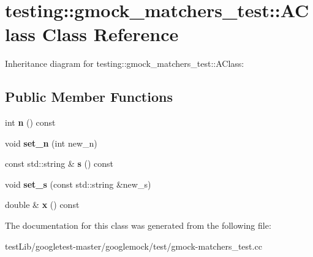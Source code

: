 \hypertarget{classtesting_1_1gmock__matchers__test_1_1AClass}{}\section{testing\+:\+:gmock\+\_\+matchers\+\_\+test\+:\+:A\+Class Class Reference}
\label{classtesting_1_1gmock__matchers__test_1_1AClass}


Inheritance diagram for testing\+:\+:gmock\+\_\+matchers\+\_\+test\+:\+:A\+Class\+:
\subsection*{Public Member Functions}
\begin{DoxyCompactItemize}
\item 
\mbox{\label{classtesting_1_1gmock__matchers__test_1_1AClass_add84ab9ef4a6bbe78719a9528bf6fb90}} 
int {\bfseries n} () const
\item 
\mbox{\label{classtesting_1_1gmock__matchers__test_1_1AClass_a3181466cec6faa5ab3c6bc5c4dbf67b2}} 
void {\bfseries set\+\_\+n} (int new\+\_\+n)
\item 
\mbox{\label{classtesting_1_1gmock__matchers__test_1_1AClass_a1645862d2061ccf04b67761314c7bb97}} 
const std\+::string \& {\bfseries s} () const
\item 
\mbox{\label{classtesting_1_1gmock__matchers__test_1_1AClass_a9e2ea4f630928618137cfaadb6298fcf}} 
void {\bfseries set\+\_\+s} (const std\+::string \&new\+\_\+s)
\item 
\mbox{\label{classtesting_1_1gmock__matchers__test_1_1AClass_ade61d438cb535d71d0dcc17a1d5bd7cd}} 
double \& {\bfseries x} () const
\end{DoxyCompactItemize}


The documentation for this class was generated from the following file\+:\begin{DoxyCompactItemize}
\item 
test\+Lib/googletest-\/master/googlemock/test/gmock-\/matchers\+\_\+test.\+cc\end{DoxyCompactItemize}
